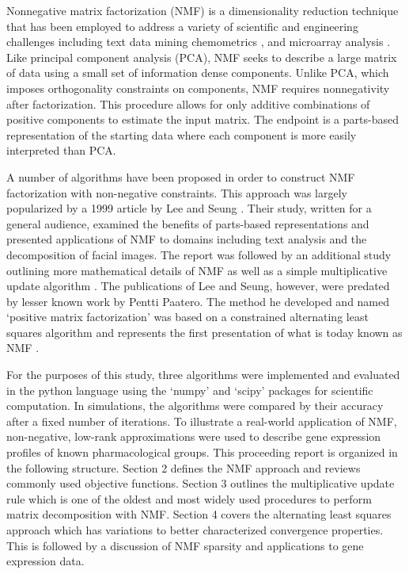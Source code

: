 \documentclass[final,leqno,onefignum,onetabnum]{siamltex1213}
\begin{document}
Nonnegative matrix factorization (NMF) is a dimensionality reduction technique that  has been employed to address a variety of scientific and engineering challenges including text data mining \cite{Pau,Lan,LeSe1} chemometrics \cite{Paa1,Paa2}, and microarray analysis \cite{Bur}. Like principal component analysis (PCA), NMF seeks to describe a large matrix of data using a small set of information dense components. Unlike PCA, which imposes orthogonality constraints on components, NMF requires nonnegativity after factorization. This procedure allows for only additive combinations of positive components to estimate the input matrix. The endpoint is a parts-based representation of the starting data where each component is more easily interpreted than PCA. 

A number of algorithms have been proposed in order to construct NMF factorization with non-negative constraints. This approach was largely popularized by a 1999 article by Lee and Seung \cite{LeSe1}. Their study, written for a general audience, examined the benefits of parts-based representations and presented applications of NMF to domains including text analysis and the decomposition of facial images. The report was followed by an additional study outlining more mathematical details of NMF as well as a simple multiplicative update algorithm \cite{LeSe2}. The publications of Lee and Seung, however, were predated by lesser known work by Pentti Paatero. The method he developed and named `positive matrix factorization' was based on a constrained alternating least squares algorithm and represents the first presentation of what is today known as NMF \cite{Paa1,Paa2}. 

For the purposes of this study, three algorithms were implemented and evaluated in the python language using the `numpy' and `scipy' packages for scientific computation. In simulations, the algorithms were compared by their accuracy after a fixed number of iterations. To illustrate a real-world application of NMF, non-negative, low-rank approximations were used to describe gene expression profiles of known pharmacological groups. This proceeding report is organized in the following structure. Section 2 defines the NMF approach and reviews commonly used objective functions. Section 3 outlines the multiplicative update rule which is one of the oldest and most widely used procedures to perform matrix decomposition with NMF. Section 4 covers the alternating least squares approach which has variations to better characterized convergence properties. This is followed by a discussion of NMF sparsity and applications to gene expression data. 
\end{document}
